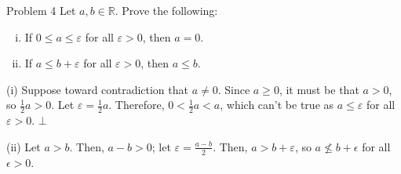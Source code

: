 \documentclass[10pt]{extarticle}
\newcommand{\R}{\mathbb{R}}
\begin{document}
  \begin{problem}{Problem 4}
    Let $a,b\in \R$. Prove the following:
    \begin{enumerate}[(i)]
      \item If $0\leq a\leq \varepsilon$ for all $\varepsilon > 0$, then $a = 0$.
      \item If $a \leq b+\varepsilon$ for all $\varepsilon > 0$, then $a\leq b$.
    \end{enumerate}
    \tcblower
    \begin{problem}{(i)}
      Suppose toward contradiction that $a\neq 0$. Since $a \geq 0$, it must be that $a > 0$, so $\frac{1}{2}a > 0$. Let $\varepsilon = \frac{1}{2}a$. Therefore, $0 < \frac{1}{2}a < a$, which can't be true as $a \leq \varepsilon$ for all $\varepsilon > 0$. $\bot$
    \end{problem}
    \begin{problem}{(ii)}
      Let $a > b$. Then, $a-b > 0$; let $\varepsilon = \frac{a-b}{2}$. Then, $a > b + \varepsilon$, so $a\not\leq b+\epsilon$ for all $\epsilon > 0$.
    \end{problem}
  \end{problem}
\end{document}
